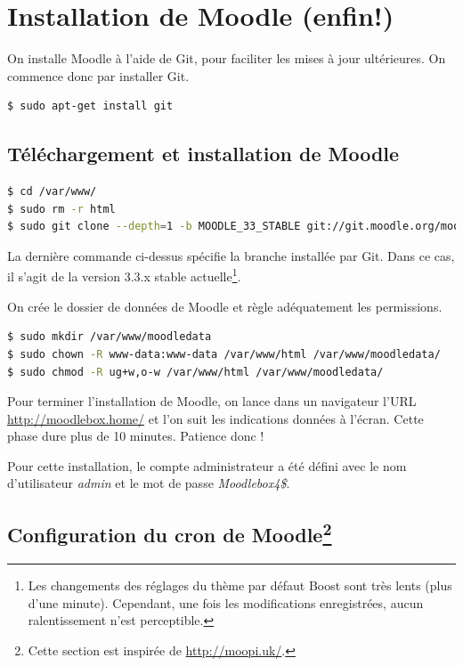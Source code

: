 \documentclass[11pt]{article}
\begin{document}
\section{Installation de Moodle (enfin!)}

On installe Moodle à l'aide de Git, pour faciliter les mises à jour ultérieures. On commence donc par installer Git.

\begin{lstlisting}[language=bash]
$ sudo apt-get install git
\end{lstlisting}

\subsection{Téléchargement et installation de Moodle}

\begin{lstlisting}[language=bash]
$ cd /var/www/
$ sudo rm -r html
$ sudo git clone --depth=1 -b MOODLE_33_STABLE git://git.moodle.org/moodle.git html
\end{lstlisting}
La dernière commande ci-dessus spécifie la branche installée par Git. Dans ce cas, il s'agit de la version 3.3.x stable actuelle\footnote{Les changements des réglages du thème par défaut Boost sont très lents (plus d'une minute). Cependant, une fois les modifications enregistrées, aucun ralentissement n'est perceptible.}.

On crée le dossier de données de Moodle et règle adéquatement les permissions.
\begin{lstlisting}[language=bash]
$ sudo mkdir /var/www/moodledata
$ sudo chown -R www-data:www-data /var/www/html /var/www/moodledata/
$ sudo chmod -R ug+w,o-w /var/www/html /var/www/moodledata/
\end{lstlisting}

Pour terminer l'installation de Moodle, on lance dans un navigateur l'URL \url{http://moodlebox.home/} et l'on suit les indications données à l'écran. Cette phase dure plus de 10 minutes. Patience donc !

Pour cette installation, le compte administrateur a été défini avec le nom d'utilisateur \emph{admin} et le mot de passe \emph{Moodlebox4\$}.

\subsection[Configuration du cron de Moodle]{Configuration du cron de Moodle\footnote{Cette section est inspirée de \url{http://moopi.uk/}.}}
\end{document}
